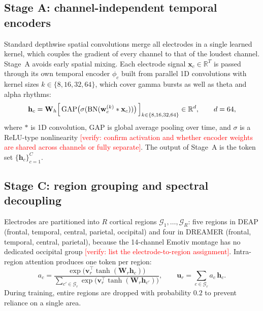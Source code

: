 \documentclass[a4paper,fleqn]{cas-sc}
\newcommand{\vrf}[1]{\textcolor{red}{[verify: #1]}}
\begin{document}
\subsection{Stage A: channel-independent temporal encoders}
Standard depthwise spatial convolutions merge all electrodes in a single learned kernel, which couples the gradient of every channel to that of the loudest channel. Stage~A avoids early spatial mixing. Each electrode signal $\mathbf{x}_c\in\mathbb{R}^{T}$ is passed through its own temporal encoder $\phi_c$ built from parallel 1D convolutions with kernel sizes $k\in\{8,16,32,64\}$, which cover gamma bursts as well as theta and alpha rhythms:
\begin{equation}
\mathbf{h}_c=\mathbf{W}_h\Bigl[\,\mathrm{GAP}\bigl(\sigma(\mathrm{BN}(\mathbf{w}^{(k)}_c * \mathbf{x}_c))\bigr)\,\Bigr]_{k\in\{8,16,32,64\}}\in\mathbb{R}^{d},\qquad d=64,
\end{equation}
where $*$ is 1D convolution, $\mathrm{GAP}$ is global average pooling over time, and $\sigma$ is a ReLU-type nonlinearity \vrf{confirm activation and whether encoder weights are shared across channels or fully separate}. The output of Stage~A is the token set $\{\mathbf{h}_c\}_{c=1}^{C}$.

\subsection{Stage C: region grouping and spectral decoupling}
Electrodes are partitioned into $R$ cortical regions $\mathcal{G}_1,\dots,\mathcal{G}_R$: five regions in DEAP (frontal, temporal, central, parietal, occipital) and four in DREAMER (frontal, temporal, central, parietal), because the 14-channel Emotiv montage has no dedicated occipital group \vrf{list the electrode-to-region assignment}. Intra-region attention produces one token per region:
\begin{equation}
a_c=\frac{\exp\bigl(\mathbf{v}_r^{\top}\tanh(\mathbf{W}_r\mathbf{h}_c)\bigr)}{\sum_{c'\in\mathcal{G}_r}\exp\bigl(\mathbf{v}_r^{\top}\tanh(\mathbf{W}_r\mathbf{h}_{c'})\bigr)},\qquad
\mathbf{u}_r=\sum_{c\in\mathcal{G}_r}a_c\,\mathbf{h}_c.
\end{equation}
During training, entire regions are dropped with probability $0.2$ to prevent reliance on a single area.
\end{document}
